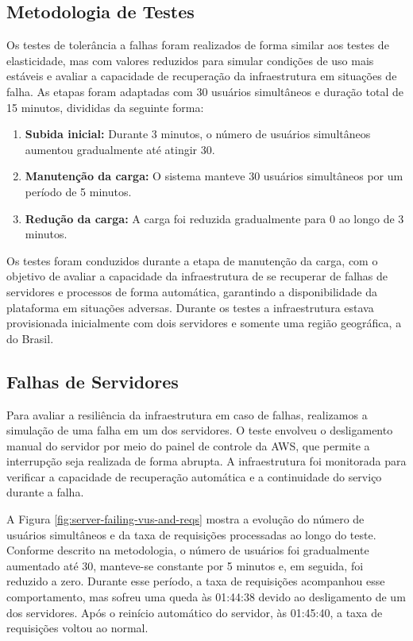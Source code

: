 \subsection{Metodologia de Testes}

Os testes de tolerância a falhas foram realizados de forma similar aos testes de elasticidade, mas com valores reduzidos para simular condições de uso mais estáveis e avaliar a capacidade de recuperação da infraestrutura em situações de falha. As etapas foram adaptadas com 30 usuários simultâneos e duração total de 15 minutos, divididas da seguinte forma:

\begin{enumerate}
    \item \textbf{Subida inicial:} Durante 3 minutos, o número de usuários simultâneos aumentou gradualmente até atingir 30.
    \item \textbf{Manutenção da carga:} O sistema manteve 30 usuários simultâneos por um período de 5 minutos.
    \item \textbf{Redução da carga:} A carga foi reduzida gradualmente para 0 ao longo de 3 minutos.
\end{enumerate}

Os testes foram conduzidos durante a etapa de manutenção da carga, com o objetivo de avaliar a capacidade da infraestrutura de se recuperar de falhas de servidores e processos de forma automática, garantindo a disponibilidade da plataforma em situações adversas. Durante os testes a infraestrutura estava provisionada inicialmente com dois servidores e somente uma região geográfica, a do Brasil.

\subsection{Falhas de Servidores}


Para avaliar a resiliência da infraestrutura em caso de falhas, realizamos a simulação de uma falha em um dos servidores. O teste envolveu o desligamento manual do servidor por meio do painel de controle da AWS, que permite a interrupção seja realizada de forma abrupta. A infraestrutura foi monitorada para verificar a capacidade de recuperação automática e a continuidade do serviço durante a falha.

A Figura \ref{fig:server-failing-vus-and-reqs} mostra a evolução do número de usuários simultâneos e da taxa de requisições processadas ao longo do teste. Conforme descrito na metodologia, o número de usuários foi gradualmente aumentado até 30, manteve-se constante por 5 minutos e, em seguida, foi reduzido a zero. Durante esse período, a taxa de requisições acompanhou esse comportamento, mas sofreu uma queda às 01:44:38 devido ao desligamento de um dos servidores. Após o reinício automático do servidor, às 01:45:40, a taxa de requisições voltou ao normal.

